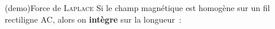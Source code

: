 \documentclass[../../main/main.tex]{subfiles}
\begin{document}
\begin{tcb*}(demo){Force de \textsc{Laplace}}
	Si le champ magnétique est homogène sur un fil rectiligne AC, alors on
	\textbf{intègre} sur la longueur~:
	\smallbreak
	\begin{isd}
		\tcblower
		\begin{center}
			\label{fig:rlp_2}
		\end{center}
	\end{isd}
\end{tcb*}
\end{document}
